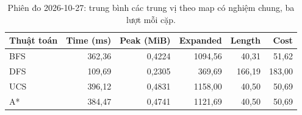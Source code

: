 \begin{table}[htbp]
\centering\small
\begin{tabular}{lrrrrr}\hline
Thuật toán & Time (ms) & Peak (MiB) & Expanded & Length & Cost \\\hline
BFS & 362,36 & 0,4224 & 1094,56 & 40,31 & 51,62 \\
DFS & 109,69 & 0,2305 & 369,69 & 166,19 & 183,00 \\
UCS & 396,12 & 0,4831 & 1158,00 & 40,50 & 50,69 \\
A* & 384,47 & 0,4741 & 1121,69 & 40,50 & 50,69 \\
\hline\end{tabular}
\caption{Phiên đo 2026-10-27: trung bình các trung vị theo map có nghiệm chung, ba lượt mỗi cặp.}
\label{tab:benchmark-heuristic-update}
\end{table}
